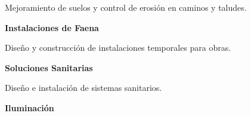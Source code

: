 \documentclass[a4paper,11pt]{article}
\begin{document}
{{\begin{center}
\begin{minipage}{18cm}
\begin{minipage}[t]{5.5cm}
{{                    \vspace{0.3cm}
                    
                    {\small Mejoramiento de suelos y control de erosión en caminos y taludes.}
                    \vspace{0.5cm}
                }}
            \end{minipage}
            \hfill
            \begin{minipage}[t]{5.5cm}
                \colorbox{blancoJM}{\parbox[t][4.5cm][t]{5.3cm}{
                    \vspace{0.5cm}
                    \centering
                    {\color{naranjaJM}\faWarehouse\quad}{\Large\color{azulJM}\textbf{Instalaciones de Faena}}
                    
                    \vspace{0.3cm}
                    
                    {\small Diseño y construcción de instalaciones temporales para obras.}
                    \vspace{0.5cm}
                }}
            \end{minipage}
            
            \vspace{0.8cm}
            
            \begin{minipage}[t]{5.5cm}
                \colorbox{blancoJM}{\parbox[t][4.5cm][t]{5.3cm}{
                    \vspace{0.5cm}
                    \centering
                    {\color{naranjaJM}\faToilet\quad}{\Large\color{azulJM}\textbf{Soluciones Sanitarias}}
                    
                    \vspace{0.3cm}
                    
                    {\small Diseño e instalación de sistemas sanitarios.}
                    \vspace{0.5cm}
                }}
            \end{minipage}
            \hfill
            \begin{minipage}[t]{5.5cm}
                \colorbox{blancoJM}{\parbox[t][4.5cm][t]{5.3cm}{
                    \vspace{0.5cm}
                    \centering
                    {\color{naranjaJM}\faLightbulb\quad}{\Large\color{azulJM}\textbf{Iluminación}}
                    
}}
\end{minipage}
\end{minipage}
\end{center}}}
\end{document}
